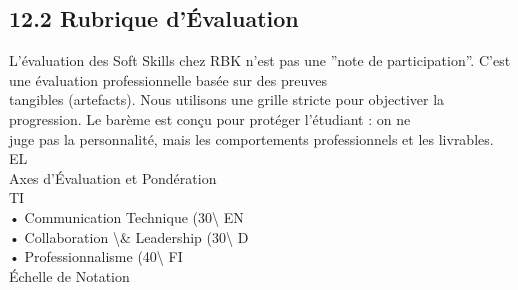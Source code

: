 \subsection{12.2 Rubrique d’Évaluation}
L’évaluation des Soft Skills chez RBK n’est pas une ”note de participation”. C’est une évaluation professionnelle basée sur des preuves\\
tangibles (artefacts). Nous utilisons une grille stricte pour objectiver la progression. Le barème est conçu pour protéger l’étudiant : on ne\\
juge pas la personnalité, mais les comportements professionnels et les livrables.\\
\vspace{0.5em}
\vspace{0.5em}
\vspace{0.5em}
\vspace{0.5em}
EL\\
Axes d’Évaluation et Pondération\\
\vspace{0.5em}
\vspace{0.5em}
\vspace{0.5em}
\vspace{0.5em}
TI\\
• Communication Technique (30\textbackslash{}%
\vspace{0.5em}
\vspace{0.5em}
\vspace{0.5em}
\vspace{0.5em}
EN\\
• Collaboration \textbackslash{}& Leadership (30\textbackslash{}%
\vspace{0.5em}
\vspace{0.5em}
\vspace{0.5em}
\vspace{0.5em}
D\\
• Professionnalisme (40\textbackslash{}%
\vspace{0.5em}
\vspace{0.5em}
\vspace{0.5em}
\vspace{0.5em}
FI\\
Échelle de Notation\\
